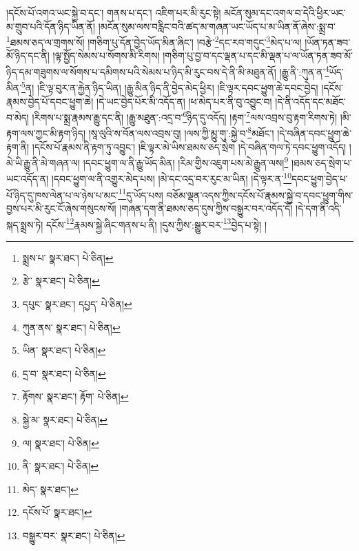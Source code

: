 །དངོས་པོ་འགའ་ཡང་སྐྱེ་བ་དང་། གནས་པ་དང་། འཇིག་པར་མི་རུང་སྟེ། མངོན་སུམ་དང་འགལ་བ་དེའི་ཕྱིར་ཡང་མ་གྲུབ་པའི་དོན་ཉིད་ཡིན་ནོ། །མངོན་སུམ་ལས་བརླིང་བའི་ཚད་མ་གཞན་ཡང་ཡོད་པ་མ་ཡིན་ནོ་ཞེས་:སྨྲ་བ་\footnote{སྨྲས་པ་  སྣར་ཐང་།  པེ་ཅིན། }ཐམས་ཅད་ལ་གྲགས་སོ། །གཅིག་པུ་དོན་བྱེད་ཡོད་མིན་ཞིང་། །བརྩེ་\footnote{རྩེ་  སྣར་ཐང་།  པེ་ཅིན། }དང་རབ་གདུང་\footnote{དཔུང་  སྣར་ཐང་། དཔྱད་  པེ་ཅིན། }མེད་པ་ལ། །ཡོན་ཏན་ཟབ་མོ་ཉིད་དང་ནི། །ལྟ་སྤྱོད་སེམས་པ་སོགས་མི་རིགས། །གཅིག་པུ་བྱ་བ་དང་ལྡན་པ་དང་མི་ལྡན་པ་ལ་ཡོན་ཏན་ཟབ་མོ་ཉིད་དམ་གཟུགས་ལ་སོགས་པ་དམིགས་པའི་སེམས་པ་ཉིད་མི་རུང་བས་དེ་ནི་མི་མཐུན་ནོ། །རྒྱུ་ནི་:ཀུན་ན་\footnote{ཀུན་ནས་  སྣར་ཐང་།  པེ་ཅིན། }ཡོད་མིན་\footnote{ཡིན་  སྣར་ཐང་།  པེ་ཅིན། }ན། །ཇི་ལྟ་བུར་ན་རྐྱེན་ཉིད་ཡིན། །རྒྱུ་མིན་ཉིད་ནི་བྱེད་མེད་ཕྱིར། །ཇི་ལྟར་དབང་ཕྱུག་ཆེ་དབང་བྱེད། །དངོས་རྣམས་བྱེད་པོ་དབང་ཕྱུག་ཆེ། །དེ་ཡང་བྱེད་པོར་མི་འདོད་ན། །ཕ་མེད་པར་ནི་བུ་འབྱུང་བ། །དེ་ནི་འདོད་དང་མཐོང་བ་མེད། །རིགས་པ་སྨྲ་རྣམས་རྒྱུ་དང་ནི། །རྒྱུ་མཐུན་:འདྲ་བ་\footnote{དྲ་བ་  སྣར་ཐང་།  པེ་ཅིན། }ཉིད་དུ་འདོད། །རྟག་\footnote{རྟོགས་  སྣར་ཐང་། རྟོག་  པེ་ཅིན། }ལས་འབྲས་བུ་རྟག་རིགས་ཏེ། །མི་རྟག་ལས་ཀྱང་མི་རྟག་ཉིད། །སཱ་ལུའི་ས་བོན་ལས་འབྲས་བུ། །ལས་ཀྱི་མྱུ་གུ་:སྐྱེ་བ་\footnote{སྐྱེ་མ་  སྣར་ཐང་།  པེ་ཅིན། }མཐོང་། །དེ་བཞིན་དབང་ཕྱུག་ཆེ་རྟག་ནི། །དངོས་པོ་རྣམས་ནི་རྟག་ཏུ་འབྱུང་། །ཇི་ལྟར་མེ་ཡིས་ཐམས་ཅད་སྲེག །དེ་བཞིན་གལ་ཏེ་དབང་ཕྱུག་འདོད། །མེ་ཡི་རྒྱུ་ནི་མེ་གཞན་ལ། །དབང་ཕྱུག་ལ་ནི་རྒྱུ་ཡོད་མིན། །རིམ་གྱིས་འཇུག་པས་མེ་རྒྱུན་ལས།\footnote{ལ།  སྣར་ཐང་།  པེ་ཅིན། } །ཐམས་ཅད་སྲེག་པ་ཡང་འདོད་ན། །དབང་ཕྱུག་ལ་ནི་འགྱུར་མེད་པས། །མེ་དང་འདྲ་བར་རུང་མ་ཡིན། །དེ་ལྟར་ན་\footnote{ནི་  སྣར་ཐང་།  པེ་ཅིན། }དབང་ཕྱུག་བྱེད་པ་པོ་ཉིད་དུ་ཁས་ལེན་པ་ལ་ཉེས་པ་མང་\footnote{མེད་  སྣར་ཐང་། }དུ་ཡོད་པས། བཅོམ་ལྡན་འདས་ཀྱིས་དངོས་པོ་རྣམས་སྐྱེ་བ་དབང་ཕྱུག་གིས་བྱས་པར་མི་རུང་ངོ་ཞེས་གསུངས་སོ། །གཞན་དག་ནི་ཐམས་ཅད་དུས་ཀྱིས་བསྒྱུར་བར་འདོད་དོ། །དེ་དག་ནི་འདི་སྐད་སྨྲས་ཏེ། དངོས་\footnote{དངོས་པོ་  སྣར་ཐང་། }རྣམས་སྐྱེ་ཞིང་གནས་པ་ནི། །དུས་ཀྱིས་:སྒྱུར་བར་\footnote{བསྒྱུར་བར་  སྣར་ཐང་།  པེ་ཅིན། }བྱེད་པ་སྟེ། །
